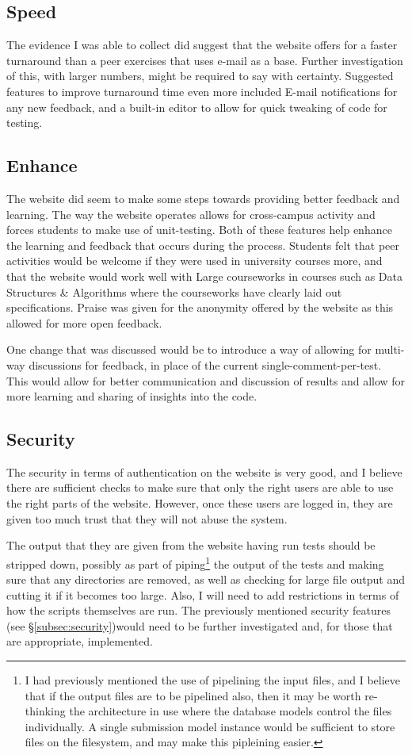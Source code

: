\documentclass[a4paper,11pt]{report}
\begin{document}
\subsection{Speed}
The evidence I was able to collect did suggest that the website offers for a faster turnaround than a peer exercises that uses e-mail as a base. Further investigation of this, with larger numbers, might be required to say with certainty. Suggested features to improve turnaround time even more included E-mail notifications for any new feedback, and a built-in editor to allow for quick tweaking of code for testing.
\subsection{Enhance}
The website did seem to make some steps towards providing better feedback and learning. The way the website operates allows for cross-campus activity and forces students to make use of unit-testing. Both of these features help enhance the learning and feedback that occurs during the process. Students felt that peer activities would be welcome if they were used in university courses more, and that the website would work well with Large courseworks in courses such as Data Structures \& Algorithms where the courseworks have clearly laid out specifications. Praise was given for the anonymity offered by the website as this allowed for more open feedback.\par
One change that was discussed would be to introduce a way of allowing for multi-way discussions for feedback, in place of the current single-comment-per-test. This would allow for better communication and discussion of results and allow for more learning and sharing of insights into the code.
\subsection{Security}
The security in terms of authentication on the website is very good, and I believe there are sufficient checks to make sure that only the right users are able to use the right parts of the website. However, once these users are logged in, they are given too much trust that they will not abuse the system.\par
The output that they are given from the website having run tests should be stripped down, possibly as part of piping\footnote{I had previously mentioned the use of pipelining the input files, and I believe that if the output files are to be pipelined also, then it may be worth re-thinking the architecture in use where the database models control the files individually. A single submission model instance would be sufficient to store files on the filesystem, and may make this pipleining easier.} the output of the tests and making sure that any directories are removed, as well as checking for large file output and cutting it if it becomes too large.
Also, I will need to add restrictions in terms of how the scripts themselves are run. The previously mentioned security features (see \S\ref{subsec:security})would need to be further investigated and, for those that are appropriate, implemented.
\end{document}
